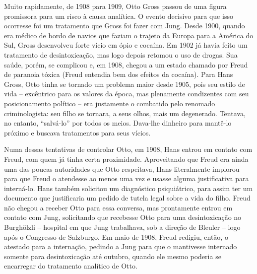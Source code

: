 Muito rapidamente, de 1908 para 1909, Otto Gross passou de uma figura
promissora para um risco à causa analítica. O evento decisivo para que
isso ocorresse foi um tratamento que Gross foi fazer com Jung. Desde
1900, quando era médico de bordo de navios que faziam o trajeto da
Europa para a América do Sul, Gross desenvolveu forte vício em ópio e
cocaína. Em 1902 já havia feito um tratamento de desintoxicação, mas
logo depois retomou o uso de drogas. Sua saúde, porém, se complicou e,
em 1908, chegou a um estado chamado por Freud de paranoia tóxica (Freud
entendia bem dos efeitos da cocaína). Para Hans Gross, Otto tinha se
tornado um problema maior desde 1905, pois seu estilo de vida --
excêntrico para os valores da época, mas plenamente condizentes com seu
posicionamento político -- era justamente o combatido pelo renomado
criminologista: seu filho se tornara, a seus olhos, mais um degenerado.
Tentava, no entanto, ``salvá-lo'' por todos os meios. Dava-lhe dinheiro
para mantê-lo próximo e buscava tratamentos para seus vícios.

Numa dessas tentativas de controlar Otto, em 1908, Hans entrou em
contato com Freud, com quem já tinha certa proximidade. Aproveitando que
Freud era ainda uma das poucas autoridades que Otto respeitava, Hans
literalmente implorou para que Freud o atendesse ao menos uma vez e
usasse alguma justificativa para interná-lo. Hans também solicitou um
diagnóstico psiquiátrico, para assim ter um documento que justificaria
um pedido de tutela legal sobre a vida do filho. Freud não chegou a
receber Otto para essa conversa, mas prontamente entrou em contato com
Jung, solicitando que recebesse Otto para uma desintoxicação no
Burghölzli -- hospital em que Jung trabalhava, sob a direção de Bleuler
-- logo após o Congresso de Salzburgo. Em maio de 1908, Freud redigiu,
então, o atestado para a internação, pedindo a Jung para que o
mantivesse internado somente para desintoxicação até outubro, quando ele
mesmo poderia se encarregar do tratamento analítico de Otto.

